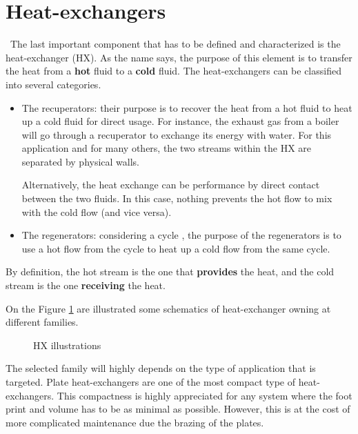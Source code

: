 \section{Heat-exchangers}
\quad\, The last important component that has to be defined and characterized is the heat-exchanger (HX). As the name says, the purpose of this element is to transfer the heat from a \textbf{hot} fluid to a \textbf{cold} fluid. The heat-exchangers can be classified into several categories\citep{Ngendakumana2018}.

\begin{itemize}
\item The recuperators: their purpose is to recover the heat from a hot fluid to heat up a cold fluid for direct usage. For instance, the exhaust gas from a boiler will go through a recuperator to exchange its energy with water. For this application and for many others, the two streams within the HX are separated by physical walls.

Alternatively, the heat exchange can be performance by direct contact between the two fluids. In this case, nothing prevents the hot flow to mix with the cold flow (and vice versa).
\item The regenerators: considering a cycle , the purpose of the regenerators is to use a hot flow from the cycle to heat up a cold flow from the same cycle. 
\end{itemize}

By definition, the hot stream is the one that \textbf{provides} the heat, and the cold stream is the one \textbf{receiving} the heat.

On the Figure \ref{fig:C3_HX} are illustrated some schematics of heat-exchanger owning at different families.
\begin{figure}[h]
\centering
{}\hfill
{}\hfill
{}
\caption{HX illustrations} \label{fig:C3_HX}
\end{figure}

The selected family will highly depends on the type of application that is targeted. Plate heat-exchangers are one of the most compact type of heat-exchangers. This compactness is highly appreciated for any system where the foot print and volume has to be as minimal as possible. However, this is at the cost of more complicated maintenance due the brazing of the plates.

